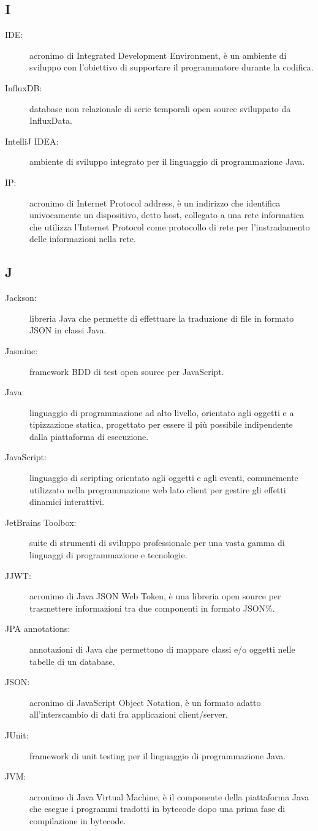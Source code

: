 \documentclass[../manuale-manutentore.tex]{subfiles}
\begin{document}
\subsection{I}

\begin{description}
    \item[IDE:] acronimo di Integrated Development Environment, è un ambiente di sviluppo con l'obiettivo di supportare il programmatore durante la codifica.
    \item[InfluxDB:] database non relazionale di serie temporali open source sviluppato da InfluxData.
    \item[IntelliJ IDEA:] ambiente di sviluppo integrato per il linguaggio di programmazione Java.
    \item[IP:] acronimo di Internet Protocol address, è un indirizzo che identifica univocamente un dispositivo, detto host, collegato a una rete informatica che utilizza l'Internet Protocol come protocollo di rete per l'instradamento delle informazioni nella rete.
\end{description}

\subsection{J}

\begin{description}
    \item[Jackson:] libreria Java che permette di effettuare la traduzione di file in formato JSON in classi Java.
    \item[Jasmine:] framework BDD di test open source per JavaScript.
    \item[Java:] linguaggio di programmazione ad alto livello, orientato agli oggetti e a tipizzazione statica, progettato per essere il più possibile indipendente dalla piattaforma di esecuzione.
    \item[JavaScript:] linguaggio di scripting orientato agli oggetti e agli eventi, comunemente utilizzato nella programmazione web lato client per gestire gli effetti dinamici interattivi.
    \item[JetBrains Toolbox:] suite di strumenti di sviluppo professionale per una vasta gamma di linguaggi di programmazione e tecnologie.
    \item[JJWT:] acronimo di Java JSON Web Token, è una libreria open source per trasmettere informazioni tra due componenti in formato JSON\%.
    \item[JPA annotations:] annotazioni di Java che permettono di mappare classi e/o oggetti nelle tabelle di un database.
    \item[JSON:] acronimo di JavaScript Object Notation, è un formato adatto all'interscambio di dati fra applicazioni client/server.
    \item[JUnit:] framework di unit testing per il linguaggio di programmazione Java.
    \item[JVM:] acronimo di Java Virtual Machine, è il componente della piattaforma Java che esegue i programmi tradotti in bytecode dopo una prima fase di compilazione in bytecode.
\end{description}
\end{document}
